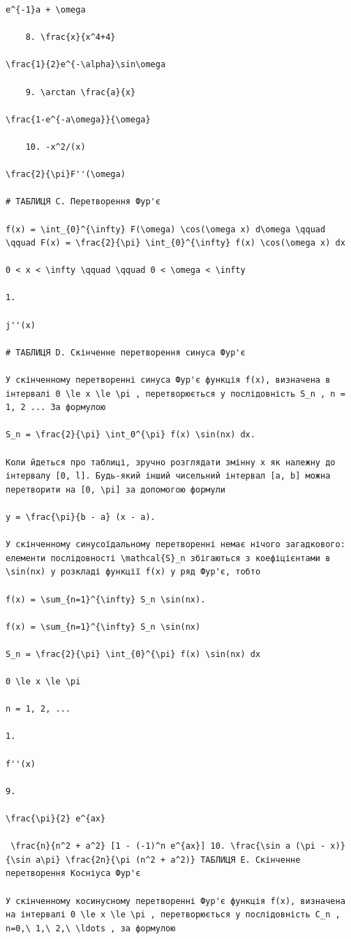 \documentclass[
  ukrainian,
]{article}
\begin{document}
\begin{verbatim}
e^{-1}a + \omega

    8. \frac{x}{x^4+4}

\frac{1}{2}e^{-\alpha}\sin\omega

    9. \arctan \frac{a}{x}

\frac{1-e^{-a\omega}}{\omega}

    10. -x^2/(x)

\frac{2}{\pi}F''(\omega)

# ТАБЛИЦЯ C. Перетворення Фур'є

f(x) = \int_{0}^{\infty} F(\omega) \cos(\omega x) d\omega \qquad \qquad F(x) = \frac{2}{\pi} \int_{0}^{\infty} f(x) \cos(\omega x) dx

0 < x < \infty \qquad \qquad 0 < \omega < \infty

1.

j''(x)

# ТАБЛИЦЯ D. Скінченне перетворення синуса Фур'є

У скінченному перетворенні синуса Фур'є функція f(x), визначена в інтервалі 0 \le x \le \pi , перетворюється у послідовність S_n , n = 1, 2 ... За формулою

S_n = \frac{2}{\pi} \int_0^{\pi} f(x) \sin(nx) dx.

Коли йдеться про таблиці, зручно розглядати змінну x як належну до інтервалу [0, l]. Будь-який інший чисельний інтервал [a, b] можна перетворити на [0, \pi] за допомогою формули

y = \frac{\pi}{b - a} (x - a).

У скінченному синусоїдальному перетворенні немає нічого загадкового: елементи послідовності \mathcal{S}_n збігаються з коефіцієнтами в \sin(nx) у розкладі функції f(x) у ряд Фур'є, тобто

f(x) = \sum_{n=1}^{\infty} S_n \sin(nx).

f(x) = \sum_{n=1}^{\infty} S_n \sin(nx)

S_n = \frac{2}{\pi} \int_{0}^{\pi} f(x) \sin(nx) dx

0 \le x \le \pi

n = 1, 2, ...

1.

f''(x)

9.

\frac{\pi}{2} e^{ax}

 \frac{n}{n^2 + a^2} [1 - (-1)^n e^{ax}] 10. \frac{\sin a (\pi - x)}{\sin a\pi} \frac{2n}{\pi (n^2 + a^2)} ТАБЛИЦЯ E. Скінченне перетворення Косніуса Фур'є

У скінченному косинусному перетворенні Фур'є функція f(x), визначена на інтервалі 0 \le x \le \pi , перетворюється у послідовність C_n , n=0,\ 1,\ 2,\ \ldots , за формулою


\end{verbatim}
\end{document}
